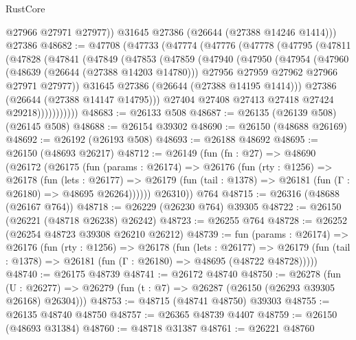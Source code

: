 \begin{lexlean}{RustCore}
\begin{coremodule}
          @27966
          @27971
          @27977))
      @31645
      @27386
      (@26644 (@27388 @14246 @1414)))
    @27386
@48682 := @47708
    (@47733
      (@47774
        (@47776
          (@47778
            (@47795
              (@47811
                (@47828
                  (@47841
                    (@47849
                      (@47853
                        (@47859
                          (@47940
                            (@47950
                              (@47954
                                (@47960
                                  (@48639 (@26644 (@27388 @14203 @14780)))
                                  @27956
                                  @27959
                                  @27962
                                  @27966
                                  @27971
                                  @27977))
                              @31645
                              @27386
                              (@26644 (@27388 @14195 @1414)))
                            @27386
                            (@26644 (@27388 @14147 @14795)))
                          @27404
                          @27408
                          @27413
                          @27418
                          @27424
                          @29218)))))))))))
@48683 := @26133 @508
@48687 := @26135 (@26139 @508) (@26145 @508)
@48688 := @26154 @39302
@48690 := @26150 (@48688 @26169)
@48692 := @26192 (@26193 @508)
@48693 := @26188 @48692
@48695 := @26150 (@48693 @26217)
@48712 := @26149
    (fun (fn : @27) =>
    @48690
      (@26172
        (@26175
          (fun (params : @26174) =>
          @26176
            (fun (rty : @1256) =>
            @26178
              (fun (lets : @26177) =>
              @26179 (fun (tail : @1378) => @26181 (fun (Γ : @26180) => @48695 @26264))))))
        @26310))
    @764
@48715 := @26316 (@48688 (@26167 @764))
@48718 := @26229 (@26230 @764) @39305
@48722 := @26150 (@26221 (@48718 @26238) @26242)
@48723 := @26255 @764
@48728 := @26252 (@26254 @48723 @39308 @26210 @26212)
@48739 := fun (params : @26174) =>
  @26176
    (fun (rty : @1256) =>
    @26178
      (fun (lets : @26177) =>
      @26179 (fun (tail : @1378) => @26181 (fun (Γ : @26180) => @48695 (@48722 @48728)))))
@48740 := @26175 @48739
@48741 := @26172 @48740
@48750 := @26278
    (fun (U : @26277) => @26279 (fun (t : @7) => @26287 (@26150 (@26293 @39305 @26168) @26304)))
@48753 := @48715 (@48741 @48750) @39303
@48755 := @26135 @48740 @48750
@48757 := @26365 @48739 @4407
@48759 := @26150 (@48693 @31384)
@48760 := @48718 @31387
@48761 := @26221 @48760

\end{coremodule}
\end{lexlean}
